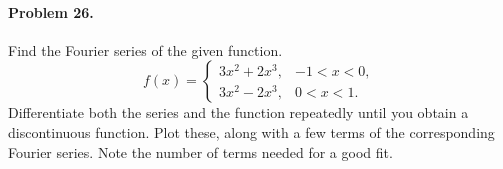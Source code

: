 \documentclass[10pt]{article}
\begin{document}
        \paragraph{Problem 26.} Find the Fourier series of the given function.
        \[
                f(x) = \begin{cases}
                        3x^2 + 2x^3, & -1 < x < 0, \\
                        3x^2 - 2x^3, & 0 < x < 1.
                \end{cases}
        \]
        Differentiate both the series and the function repeatedly until you obtain a discontinuous function. Plot these, along
        with a few terms of the corresponding Fourier series. Note the number of terms needed for a good fit. \\
\end{document}
